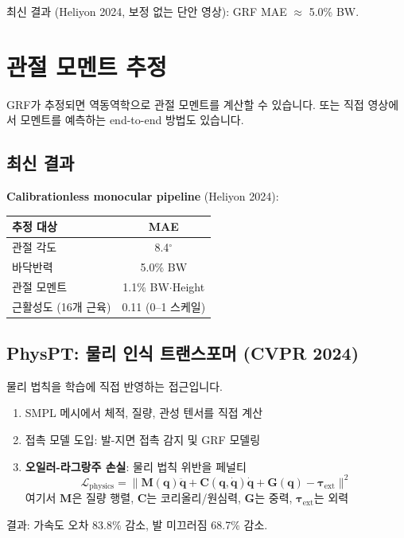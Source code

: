 \documentclass[11pt, a4paper]{report}
\begin{document}
최신 결과 (Heliyon 2024, 보정 없는 단안 영상): GRF MAE $\approx$ 5.0\% BW.


\section{관절 모멘트 추정}

GRF가 추정되면 역동역학으로 관절 모멘트를 계산할 수 있습니다. 또는 직접 영상에서 모멘트를 예측하는 end-to-end 방법도 있습니다.

\subsection{최신 결과}

\textbf{Calibrationless monocular pipeline} (Heliyon 2024):

\begin{center}
\renewcommand{\arraystretch}{1.3}
\begin{tabular}{lc}
\toprule
\textbf{추정 대상} & \textbf{MAE} \\
\midrule
관절 각도 & 8.4$^\circ$ \\
바닥반력 & 5.0\% BW \\
관절 모멘트 & 1.1\% BW$\cdot$Height \\
근활성도 (16개 근육) & 0.11 (0--1 스케일) \\
\bottomrule
\end{tabular}
\end{center}

\subsection{PhysPT: 물리 인식 트랜스포머 (CVPR 2024)}

물리 법칙을 학습에 직접 반영하는 접근입니다.

\begin{cvbox}[title={PhysPT 핵심 아이디어}]
\begin{enumerate}[leftmargin=*]
  \item SMPL 메시에서 체적, 질량, 관성 텐서를 직접 계산
  \item 접촉 모델 도입: 발-지면 접촉 감지 및 GRF 모델링
  \item \textbf{오일러-라그랑주 손실}: 물리 법칙 위반을 페널티
  \begin{equation}
    \mathcal{L}_{\text{physics}} = \| \mathbf{M}(\mathbf{q})\ddot{\mathbf{q}} + \mathbf{C}(\mathbf{q}, \dot{\mathbf{q}})\dot{\mathbf{q}} + \mathbf{G}(\mathbf{q}) - \bm{\tau}_{\text{ext}} \|^2
  \end{equation}
  여기서 $\mathbf{M}$은 질량 행렬, $\mathbf{C}$는 코리올리/원심력, $\mathbf{G}$는 중력, $\bm{\tau}_{\text{ext}}$는 외력
\end{enumerate}
결과: 가속도 오차 83.8\% 감소, 발 미끄러짐 68.7\% 감소.
\end{cvbox}
\end{document}
